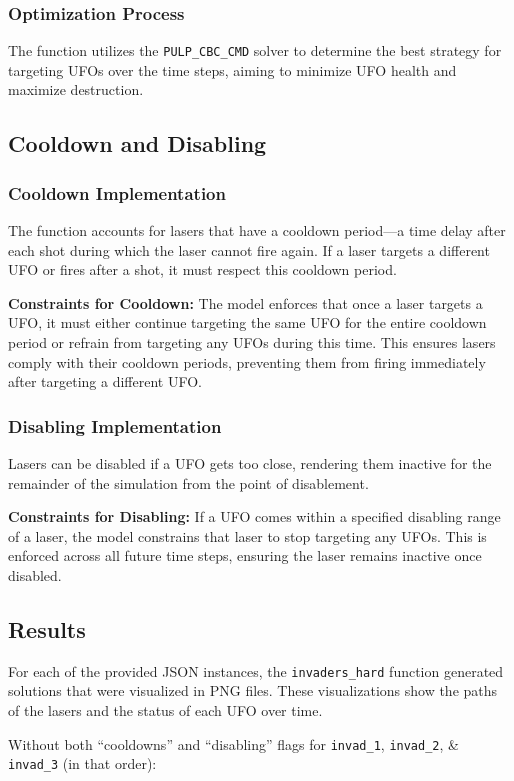 \documentclass[12pt]{article}
\begin{document}
\subsubsection{Optimization Process}
The function utilizes the \texttt{PULP\_CBC\_CMD} solver to determine the best strategy for targeting UFOs over the time steps, aiming to minimize UFO health and maximize destruction.

\subsection{Cooldown and Disabling}
\subsubsection{Cooldown Implementation}
The function accounts for lasers that have a cooldown period—a time delay after each shot during which the laser cannot fire again. If a laser targets a different UFO or fires after a shot, it must respect this cooldown period.

\textbf{Constraints for Cooldown:} The model enforces that once a laser targets a UFO, it must either continue targeting the same UFO for the entire cooldown period or refrain from targeting any UFOs during this time. This ensures lasers comply with their cooldown periods, preventing them from firing immediately after targeting a different UFO.

\subsubsection{Disabling Implementation}
Lasers can be disabled if a UFO gets too close, rendering them inactive for the remainder of the simulation from the point of disablement.

\textbf{Constraints for Disabling:} If a UFO comes within a specified disabling range of a laser, the model constrains that laser to stop targeting any UFOs. This is enforced across all future time steps, ensuring the laser remains inactive once disabled.

\subsection{Results}
For each of the provided JSON instances, the \texttt{invaders\_hard} function generated solutions that were visualized in PNG files. These visualizations show the paths of the lasers and the status of each UFO over time.

Without both “cooldowns” and “disabling” flags for \texttt{invad\_1}, \texttt{invad\_2}, \& \texttt{invad\_3} (in that order):
\end{document}

